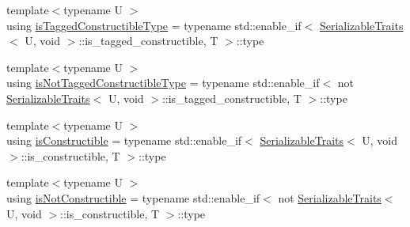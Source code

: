 \begin{DoxyCompactItemize}
\item 
{\footnotesize template$<$typename U $>$ }\\using \hyperlink{structcheckpoint_1_1dispatch_1_1_reconstructor_a59b6cbc4d45b5b293cbd1cd622ba86f9}{is\+Tagged\+Constructible\+Type} = typename std\+::enable\+\_\+if$<$ \hyperlink{structcheckpoint_1_1_serializable_traits}{Serializable\+Traits}$<$ U, void $>$\+::is\+\_\+tagged\+\_\+constructible, T $>$\+::type
\item 
{\footnotesize template$<$typename U $>$ }\\using \hyperlink{structcheckpoint_1_1dispatch_1_1_reconstructor_ad77b3a3fcf6fe7ed97698d6ca42b16c7}{is\+Not\+Tagged\+Constructible\+Type} = typename std\+::enable\+\_\+if$<$ not \hyperlink{structcheckpoint_1_1_serializable_traits}{Serializable\+Traits}$<$ U, void $>$\+::is\+\_\+tagged\+\_\+constructible, T $>$\+::type
\item 
{\footnotesize template$<$typename U $>$ }\\using \hyperlink{structcheckpoint_1_1dispatch_1_1_reconstructor_a6bba60a4c85d06d3e17388dfc5a55554}{is\+Constructible} = typename std\+::enable\+\_\+if$<$ \hyperlink{structcheckpoint_1_1_serializable_traits}{Serializable\+Traits}$<$ U, void $>$\+::is\+\_\+constructible, T $>$\+::type
\item 
{\footnotesize template$<$typename U $>$ }\\using \hyperlink{structcheckpoint_1_1dispatch_1_1_reconstructor_acfaccf4e4d76f6fdf5fc4890f01a6744}{is\+Not\+Constructible} = typename std\+::enable\+\_\+if$<$ not \hyperlink{structcheckpoint_1_1_serializable_traits}{Serializable\+Traits}$<$ U, void $>$\+::is\+\_\+constructible, T $>$\+::type
\end{DoxyCompactItemize}
